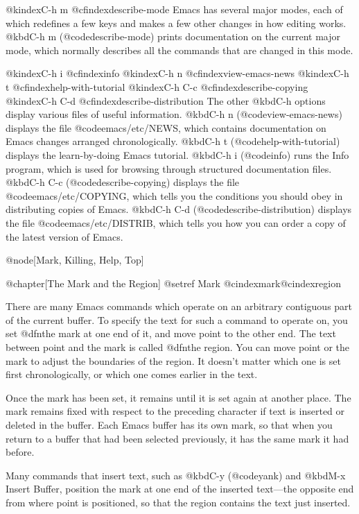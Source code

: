 {{{{@kindex{C-h m}
@cfindex{describe-mode}
  Emacs has several major modes, each of which redefines a few keys and
makes a few other changes in how editing works.  @kbd{C-h m}
(@code{describe-mode}) prints documentation on the current major mode,
which normally describes all the commands that are changed in this mode.

@kindex{C-h i}
@cfindex{info}
@kindex{C-h n}
@cfindex{view-emacs-news}
@kindex{C-h t}
@cfindex{help-with-tutorial}
@kindex{C-h C-c}
@cfindex{describe-copying}
@kindex{C-h C-d}
@cfindex{describe-distribution}
  The other @kbd{C-h} options display various files of useful information.
@kbd{C-h n} (@code{view-emacs-news}) displays the file
@code{emacs/etc/NEWS}, which contains documentation on Emacs changes
arranged chronologically.  @kbd{C-h t} (@code{help-with-tutorial}) displays
the learn-by-doing Emacs tutorial.  @kbd{C-h i} (@code{info}) runs the Info
program, which is used for browsing through structured documentation files.
@kbd{C-h C-c} (@code{describe-copying}) displays the file
@code{emacs/etc/COPYING}, which tells you the conditions you should obey in
distributing copies of Emacs.  @kbd{C-h C-d} (@code{describe-distribution})
displays the file @code{emacs/etc/DISTRIB}, which tells you how you can
order a copy of the latest version of Emacs.

@node[Mark, Killing, Help, Top]

@chapter[The Mark and the Region]
@setref Mark
@cindex{mark}@cindex{region}

  There are many Emacs commands which operate on an arbitrary contiguous
part of the current buffer.  To specify the text for such a command to
operate on, you set @dfn{the mark} at one end of it, and move point to the
other end.  The text between point and the mark is called @dfn{the region}.
You can move point or the mark to adjust the boundaries of the region.  It
doesn't matter which one is set first chronologically, or which one comes
earlier in the text.

  Once the mark has been set, it remains until it is set again at another
place.  The mark remains fixed with respect to the preceding character if
text is inserted or deleted in the buffer.  Each Emacs buffer has its own
mark, so that when you return to a buffer that had been selected
previously, it has the same mark it had before.

  Many commands that insert text, such as @kbd{C-y} (@code{yank}) and
@kbd{M-x Insert Buffer}, position the mark at one end of the inserted
text---the opposite end from where point is positioned, so that the region
contains the text just inserted.

}}}}
